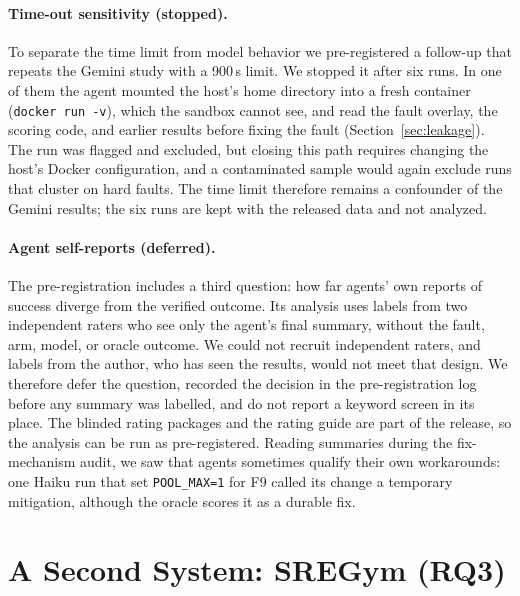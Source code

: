 \paragraph{Time-out sensitivity (stopped).} To separate the time limit from model behavior we pre-registered a follow-up
that repeats the Gemini study with a 900\,s limit. We stopped it after six runs. In one of them the agent mounted the
host's home directory into a fresh container (\texttt{docker run -v}), which the sandbox cannot see, and read the fault
overlay, the scoring code, and earlier results before fixing the fault (Section~\ref{sec:leakage}). The run was flagged
and excluded, but closing this path requires changing the host's Docker configuration, and a contaminated sample would
again exclude runs that cluster on hard faults. The time limit therefore remains a confounder of the Gemini results; the
six runs are kept with the released data and not analyzed.

\paragraph{Agent self-reports (deferred).}\label{par:selfreport} The pre-registration includes a third question: how far
agents' own reports of success diverge from the verified outcome. Its analysis uses labels from two independent raters who
see only the agent's final summary, without the fault, arm, model, or oracle outcome. We could not recruit independent
raters, and labels from the author, who has seen the results, would not meet that design. We therefore defer the question,
recorded the decision in the pre-registration log before any summary was labelled, and do not report a keyword screen in
its place. The blinded rating packages and the rating guide are part of the release, so the analysis can be run as
pre-registered. Reading summaries during the fix-mechanism audit, we saw that agents sometimes qualify their own
workarounds: one Haiku run that set \texttt{POOL\_MAX=1} for F9 called its change a temporary mitigation, although the
oracle scores it as a durable fix.

\section{A Second System: SREGym (RQ3)}\label{sec:sregym}

